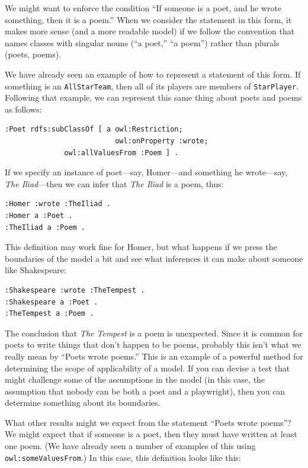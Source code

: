We might want to enforce the condition ``If someone is a poet, and he
wrote something, then it is a poem.'' When we consider the statement in
this form, it makes more sense (and a more readable model) if we follow
the convention that names classes with singular nouns (``a poet,'' ``a
poem'') rather than plurals (poets, poems).

We have already seen an example of how to represent a statement of this
form. If something is an \texttt{AllStarTeam}, then all of its players are
members of \texttt{StarPlayer}. Following that example, we can represent this
same thing about poets and poems as follows:

\begin{lstlisting}
:Poet rdfs:subClassOf [ a owl:Restriction;
                          owl:onProperty :wrote;
			  owl:allValuesFrom :Poem ] .
\end{lstlisting}

If we specify an instance of poet---say, Homer---and something he
wrote---say, \emph{The Iliad}---then we can infer that \emph{The Iliad} is a poem,
thus:

\begin{lstlisting}
:Homer :wrote :TheIliad .
:Homer a :Poet .
:TheIliad a :Poem .
\end{lstlisting}

This definition may work fine for Homer, but what happens if we press
the boundaries of the model a bit and see what inferences it can make
about someone like Shakespeare:

\begin{lstlisting}
:Shakespeare :wrote :TheTempest .
:Shakespeare a :Poet .
:TheTempest a :Poem .
\end{lstlisting}

The conclusion that \emph{The Tempest} is a poem is unexpected. Since it is
common for poets to write things that don't happen to be poems, probably
this isn't what we really mean by ``Poets wrote poems.'' This is an
example of a powerful method for determining the scope of applicability
of a model. If you can devise a test that might challenge some of the
assumptions in the model (in this case, the
assumption that nobody can be both a poet and a playwright), then you
can determine something about its boundaries.

What other results might we expect from the statement ``Poets wrote
poems''? We might expect that if someone is a poet, then they must have
written at least one poem. (We have already seen a number of examples of
this using \texttt{owl:someValuesFrom}.) In this case, this definition looks like
this:

